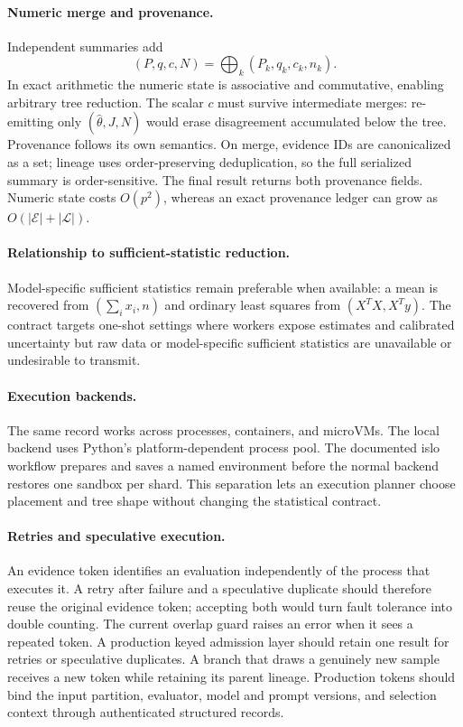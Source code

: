 \paragraph{Numeric merge and provenance.}
Independent summaries add
\begin{equation}
(P,q,c,N)=\bigoplus_k(P_k,q_k,c_k,n_k).
\label{eq:merge}
\end{equation}
In exact arithmetic the numeric state is associative and commutative, enabling arbitrary tree
reduction. The scalar $c$ must survive intermediate merges: re-emitting only
$(\hat\theta,J,N)$ would erase disagreement accumulated below the tree. Provenance follows its
own semantics. On merge, evidence IDs are canonicalized as a set; lineage uses order-preserving
deduplication, so the full serialized summary is order-sensitive. The final result returns both
provenance fields. Numeric state costs $O(p^2)$, whereas an exact
provenance ledger can grow as $O(|\mathcal E|+|\mathcal L|)$.

\paragraph{Relationship to sufficient-statistic reduction.}
Model-specific sufficient statistics remain preferable when available: a mean is recovered from
$(\sum_i x_i,n)$ and ordinary least squares from $(X^TX,X^Ty)$. The contract targets one-shot
settings where workers expose estimates and calibrated uncertainty but raw data or
model-specific sufficient statistics are unavailable or undesirable to transmit.

\paragraph{Execution backends.}
The same record works across processes, containers, and microVMs. The local backend uses
Python's platform-dependent process pool. The documented islo workflow prepares and saves a
named environment before the normal backend restores one sandbox per shard. This separation
lets an execution planner choose placement and tree shape without changing the statistical
contract.

\paragraph{Retries and speculative execution.}
An evidence token identifies an evaluation independently of the process that executes it. A
retry after failure and a speculative duplicate should therefore reuse the original evidence
token; accepting both would turn fault tolerance into double counting. The current overlap guard
raises an error when it sees a repeated token. A production keyed admission layer should retain
one result for retries or speculative duplicates. A branch that draws a genuinely new
sample receives a new token while retaining its parent lineage. Production tokens should bind
the input partition, evaluator, model and prompt versions, and selection context through
authenticated structured records.

